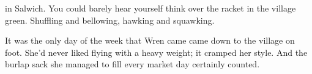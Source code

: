
 in Salwich.
You could barely hear yourself think over the racket in the village green.
Shuffling and bellowing, hawking and squawking.

It was the only day of the week that Wren came came down to the village on foot.
She'd never liked flying with a heavy weight; it cramped her style.
And the burlap sack she managed to fill every market day certainly counted.
